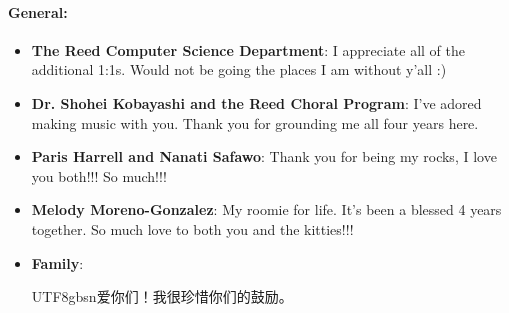 \documentclass[12pt,twoside]{reedthesis}
\begin{document}
    \paragraph{General: }    
    \begin{itemize}
        \item \textbf{The Reed Computer Science Department}: I appreciate all of the additional 1:1s. Would not be going the places I am without y'all :)
        \item \textbf{Dr. Shohei Kobayashi and the Reed Choral Program}: I've adored making music with you. Thank you for grounding me all four years here.
        \item \textbf{Paris Harrell and Nanati Safawo}: Thank you for being my rocks, I love you both!!! So much!!!
        \item \textbf{Melody Moreno-Gonzalez}: My roomie for life. It's been a blessed 4 years together. So much love to both you and the kitties!!!
        \item \textbf{Family}: \begin{CJK*}{UTF8}{gbsn}爱你们！我很珍惜你们的鼓励。\end{CJK*}
    \end{itemize}

\end{document}
